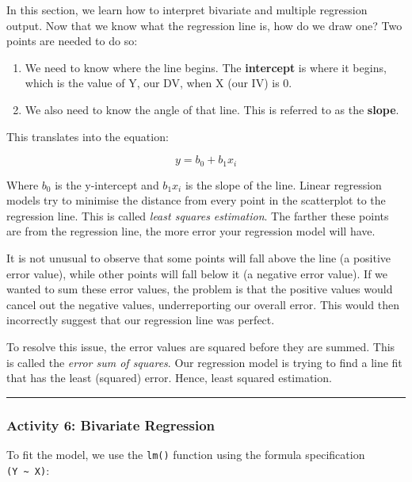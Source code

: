 \documentclass[
]{book}
\begin{document}
In this section, we learn how to interpret bivariate and multiple regression output. Now that we know what the regression line is, how do we draw one? Two points are needed to do so:

\begin{enumerate}
\def\labelenumi{\arabic{enumi}.}
\item
  We need to know where the line begins. The \textbf{intercept} is where it begins, which is the value of Y, our DV, when X (our IV) is 0.
\item
  We also need to know the angle of that line. This is referred to as the \textbf{slope}.
\end{enumerate}

This translates into the equation:

\[y = b_0 + b_1x_i\]

Where \(b_0\) is the y-intercept and \(b_1x_i\) is the slope of the line. Linear regression models try to minimise the distance from every point in the scatterplot to the regression line. This is called \emph{least squares estimation}. The farther these points are from the regression line, the more error your regression model will have.

It is not unusual to observe that some points will fall above the line (a positive error value), while other points will fall below it (a negative error value). If we wanted to sum these error values, the problem is that the positive values would cancel out the negative values, underreporting our overall error. This would then incorrectly suggest that our regression line was perfect.

To resolve this issue, the error values are squared before they are summed. This is called the \emph{error sum of squares}. Our regression model is trying to find a line fit that has the least (squared) error. Hence, least squared estimation.

\begin{center}\rule{0.5\linewidth}{0.5pt}\end{center}

\hypertarget{activity-6-bivariate-regression}{%
\subsubsection{Activity 6: Bivariate Regression}\label{activity-6-bivariate-regression}}

To fit the model, we use the \texttt{lm()} function using the formula specification \texttt{(Y\ \textasciitilde{}\ X)}:
\end{document}
